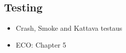 
 \subsection{Testing}
 
 \begin{itemize}
 
 \item Crash, Smoke and Kattava testaus
 
 \item ECO: Chapter 5
 
 \end{itemize}
